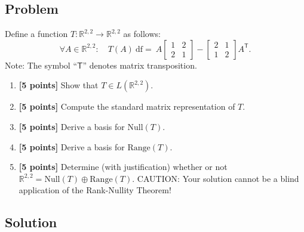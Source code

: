 \documentclass[12pt]{article}
\newcommand{\R}{\mathbb{R}}
\begin{document}
\subsection{Problem}
Define a function $T:\R^{2,2}\to \R^{2,2}$ as follows:
\[
\forall A\in \R^{2,2}:\quad
T(A)\ \mathrm{df}=\ A
\begin{bmatrix}1&2\\2&1\end{bmatrix}
-
\begin{bmatrix}2&1\\1&2\end{bmatrix}
A^{\mathsf T}.
\]
Note: The symbol ``$\mathsf T$'' denotes matrix transposition.
\begin{enumerate}[label=(\alph*)]
\item \textbf{[5 points]} Show that $T\in L(\R^{2,2})$.
\item \textbf{[5 points]} Compute the standard matrix representation of $T$.
\item \textbf{[5 points]} Derive a basis for $\mathrm{Null}(T)$.
\item \textbf{[5 points]} Derive a basis for $\mathrm{Range}(T)$.
\item \textbf{[5 points]} Determine (with justification) whether or not $\R^{2,2}=\mathrm{Null}(T)\oplus \mathrm{Range}(T)$.
\newline CAUTION: Your solution cannot be a blind application of the Rank-Nullity Theorem!
\end{enumerate}

\bigskip
\bigskip
\subsection{Solution}
\end{document}
